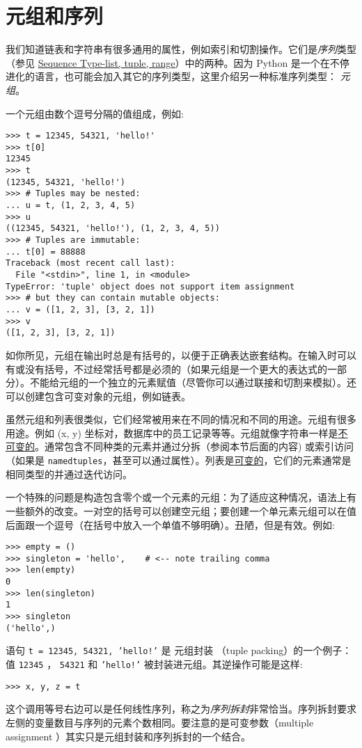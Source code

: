 \section{元组和序列\label{DataStructures:TupleSequence}}
我们知道链表和字符串有很多通用的属性，例如索引和切割操作。它们是\emph{序列}类型（参见 \href{https://docs.python.org/3/library/stdtypes.html#sequence-types-list-tuple-range}{Sequence Type-list, tuple, range}）中的两种。因为 Python 是一个在不停进化的语言，也可能会加入其它的序列类型，这里介绍另一种标准序列类型： \emph{元组}。

一个元组由数个逗号分隔的值组成，例如:
\begin{lstlisting}
>>> t = 12345, 54321, 'hello!'
>>> t[0]
12345
>>> t
(12345, 54321, 'hello!')
>>> # Tuples may be nested:
... u = t, (1, 2, 3, 4, 5)
>>> u
((12345, 54321, 'hello!'), (1, 2, 3, 4, 5))
>>> # Tuples are immutable:
... t[0] = 88888
Traceback (most recent call last):
  File "<stdin>", line 1, in <module>
TypeError: 'tuple' object does not support item assignment
>>> # but they can contain mutable objects:
... v = ([1, 2, 3], [3, 2, 1])
>>> v
([1, 2, 3], [3, 2, 1])
\end{lstlisting}
如你所见，元组在输出时总是有括号的，以便于正确表达嵌套结构。在输入时可以有或没有括号，不过经常括号都是必须的（如果元组是一个更大的表达式的一部分）。不能给元组的一个独立的元素赋值（尽管你可以通过联接和切割来模拟）。还可以创建包含可变对象的元组，例如链表。

虽然元组和列表很类似，它们经常被用来在不同的情况和不同的用途。元组有很多用途。例如 (x, y) 坐标对，数据库中的员工记录等等。元组就像字符串一样是\href{https://docs.python.org/3/glossary.html#term-immutable}{不可变的}。通常包含不同种类的元素并通过分拆（参阅本节后面的内容) 或索引访问（如果是 \texttt{namedtuples}，甚至可以通过属性）。列表是\href{https://docs.python.org/3/glossary.html#term-mutable}{可变的}，它们的元素通常是相同类型的并通过迭代访问。

一个特殊的问题是构造包含零个或一个元素的元组：为了适应这种情况，语法上有一些额外的改变。一对空的括号可以创建空元组；要创建一个单元素元组可以在值后面跟一个逗号（在括号中放入一个单值不够明确）。丑陋，但是有效。例如:
\begin{lstlisting}
>>> empty = ()
>>> singleton = 'hello',    # <-- note trailing comma
>>> len(empty)
0
>>> len(singleton)
1
>>> singleton
('hello',)
\end{lstlisting}
语句 \texttt{t = 12345, 54321, 'hello!'} 是 元组封装 （tuple packing）的一个例子：值 \texttt{12345} ， \texttt{54321} 和 \texttt{'hello!'} 被封装进元组。其逆操作可能是这样:
\begin{lstlisting}
>>> x, y, z = t
\end{lstlisting}
这个调用等号右边可以是任何线性序列，称之为\emph{序列拆封}非常恰当。序列拆封要求左侧的变量数目与序列的元素个数相同。要注意的是可变参数（multiple assignment ）其实只是元组封装和序列拆封的一个结合。
